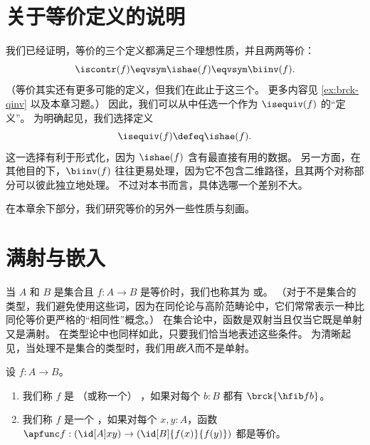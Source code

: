 %
%
%

\section{关于等价定义的说明}
\label{sec:concluding-remarks}

我们已经证明，等价的三个定义都满足三个理想性质，并且两两等价：
\[ \iscontr(f) \eqvsym \ishae(f) \eqvsym \biinv(f). \]
（等价其实还有更多可能的定义，但我们在此止于这三个。
更多内容见 \cref{ex:brck-qinv} 以及本章习题。）
因此，我们可以从中任选一个作为 $\isequiv (f)$ 的“定义”。
为明确起见，我们选择定义
\[ \isequiv(f) \defeq \ishae(f).\]
%
这一选择有利于形式化，因为 $\ishae(f)$ 含有最直接有用的数据。
另一方面，在其他目的下，$\biinv(f)$ 往往更易处理，因为它不包含二维路径，且其两个对称部分可以彼此独立地处理。
不过对本书而言，具体选哪一个差别不大。

在本章余下部分，我们研究等价的另外一些性质与刻画。
%

\section{满射与嵌入}
\label{sec:mono-surj}

当 $A$ 和 $B$ 是集合且 $f:A\to B$ 是等价时，我们也称其为
%
或。
%
%
（对于不是集合的类型，我们避免使用这些词，因为在同伦论与高阶范畴论中，它们常常表示一种比同伦等价更严格的“相同性”概念。）
在集合论中，函数是双射当且仅当它既是单射又是满射。
在类型论中也同样如此，只要我们恰当地表述这些条件。
为清晰起见，当处理不是集合的类型时，我们用\emph{嵌入}而不是单射。

\begin{defn}\label{defn:surj-emb}
  设 $f:A\to B$。
  \begin{enumerate}
  \item 我们称 $f$ 是
    （或称一个）
    ，如果对每个 $b:B$ 都有 $\brck{\hfib f b}$。
  \item 我们称 $f$ 是一个
    ，如果对每个 $x,y:A$，函数 $\apfunc f : (\id[A]xy) \to (\id[B]{f(x)}{f(y)})$ 都是等价。
  \end{enumerate}
\end{defn}

